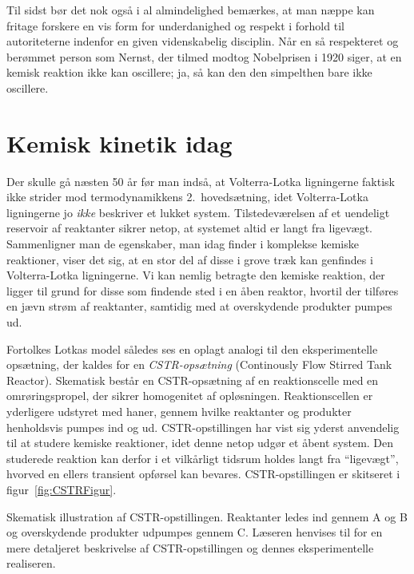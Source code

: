 \vspace{4.0mm}
Til sidst b{\o}r det nok ogs{\aa} i al almindelighed
bem{\ae}rkes, at man n{\ae}ppe kan fritage forskere en vis
form for underdanighed og respekt i forhold til
autoriteterne indenfor en given videnskabelig disciplin.
N{\aa}r en s{\aa} respekteret og ber{\o}mmet person som
Nernst, der tilmed modtog Nobelprisen i 1920 siger, at en
kemisk reaktion ikke kan oscillere; ja, s{\aa} kan den den
simpelthen bare ikke oscillere.

\section{Kemisk kinetik idag}
\label{ModernKinetics}
Der skulle g{\aa} n{\ae}sten 50 {\aa}r f{\o}r man
inds{\aa}, at Volterra-Lotka lig\-ningerne faktisk ikke
strider mod termodynamikkens 2.\ hoveds{\ae}tning, idet
Volterra-Lotka lig\-ningerne jo {\em ikke\/} beskriver et
lukket system. Tilstedev{\ae}relsen af et uendeligt
reservoir af reaktanter sikrer netop, at systemet altid er
langt fra ligev{\ae}gt. Sammenligner man de egen\-skaber,
man idag finder i komplekse kemiske reaktioner, viser det
sig, at en stor del af disse i grove tr{\ae}k kan
genfindes i Volterra-Lotka lig\-ningerne. Vi kan nemlig
betragte den kemiske reaktion, der ligger til grund for
disse som findende sted i en {\aa}ben reaktor, hvortil der
tilf{\o}res en j{\ae}vn str{\o}m af reaktanter, samtidig
med at overskydende produkter pumpes ud.

\vspace{4.0mm}
Fortolkes Lotkas model s{\aa}ledes ses en oplagt analogi
til den eksperimentelle ops{\ae}tning, der kaldes for en
{\em CSTR-ops{\ae}tning\/} (Continously Flow Stirred Tank
Reactor). Skematisk best{\aa}r en CSTR-ops{\ae}tning af en
reaktions\-celle med en omr{\o}ringspropel, der sikrer
homogenitet af opl{\o}sningen. Reaktionscellen er
yder\-ligere udstyret med haner, gennem hvilke reaktanter
og produkter henholdsvis pum\-pes ind og ud.
CSTR-opstillingen har vist sig yderst anvendelig til at
studere ke\-miske reaktioner, idet denne netop udg{\o}r et
{\aa}bent system. Den studerede reaktion kan derfor i et
vilk{\aa}rligt tidsrum holdes langt fra ``ligev{\ae}gt'',
hvorved en ellers transient opf{\o}rsel kan bevares.
CSTR-opstillingen er skitseret i figur~\ref{fig:CSTRFigur}.

{
 \vspace{3.0mm}
 
}
{
\caption{\protect\capsize Skematisk illustration af
CSTR-opstillingen. Reaktanter ledes ind gennem A og B og
overskydende produkter udpumpes gennem C. L{\ae}seren
henvises til \cite{CSTRfig} for en mere detaljeret
beskrivelse af CSTR-opstillingen og dennes eksperimentelle
realiseren.}
\label{fig:CSTRFigur}
}



